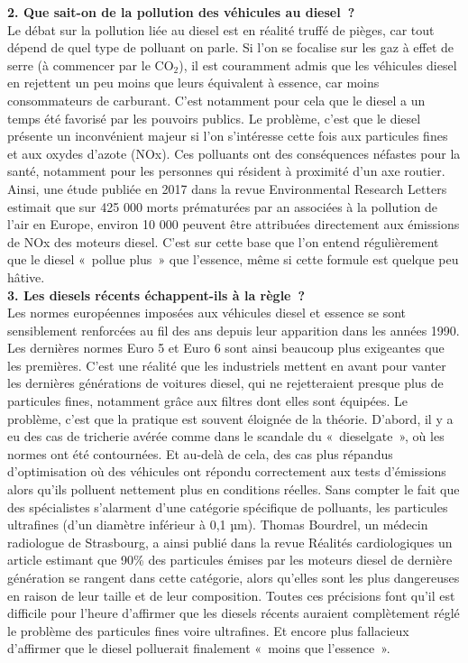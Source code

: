 \documentclass[8pt]{article}
\begin{document}
\textbf{2. Que sait-on de la pollution des véhicules au diesel~?}\\

Le débat sur la pollution liée au diesel est en réalité truffé de pièges, car tout dépend de quel type de polluant on parle. Si l’on se focalise sur les gaz à effet de serre (à commencer par le CO$_2$), il est couramment admis que les véhicules diesel en rejettent un peu moins que leurs équivalent à essence, car moins consommateurs de carburant. C’est notamment pour cela que le diesel a un temps été favorisé par les pouvoirs publics.
Le problème, c’est que le diesel présente un inconvénient majeur si l’on s’intéresse cette fois aux particules fines et aux oxydes d’azote (NOx). Ces polluants ont des conséquences néfastes pour la santé, notamment pour les personnes qui résident à proximité d’un axe routier.
Ainsi, une étude publiée en 2017 dans la revue Environmental Research Letters estimait que sur 425 000 morts prématurées par an associées à la pollution de l’air en Europe, environ 10 000 peuvent être attribuées directement aux émissions de NOx des moteurs diesel. C’est sur cette base que l’on entend régulièrement que le diesel «~pollue plus~» que l’essence, même si cette formule est quelque peu hâtive.\\

\textbf{3. Les diesels récents échappent-ils à la règle~?}\\

Les normes européennes imposées aux véhicules diesel et essence se sont sensiblement renforcées au fil des ans depuis leur apparition dans les années 1990. Les dernières normes Euro 5 et Euro 6 sont ainsi beaucoup plus exigeantes que les premières. C’est une réalité que les industriels mettent en avant pour vanter les dernières générations de voitures diesel, qui ne rejetteraient presque plus de particules fines, notamment grâce aux filtres dont elles sont équipées.
Le problème, c’est que la pratique est souvent éloignée de la théorie. D’abord, il y a eu des cas de tricherie avérée comme dans le scandale du «~dieselgate~», où les normes ont été contournées. Et au-delà de cela, des cas plus répandus d’optimisation où des véhicules ont répondu correctement aux tests d’émissions alors qu’ils polluent nettement plus en conditions réelles.
Sans compter le fait que des spécialistes s’alarment d’une catégorie spécifique de polluants, les particules ultrafines (d’un diamètre inférieur à 0,1 µm). Thomas Bourdrel, un médecin radiologue de Strasbourg, a ainsi publié dans la revue Réalités cardiologiques un article estimant que 90\% des particules émises par les moteurs diesel de dernière génération se rangent dans cette catégorie, alors qu’elles sont les plus dangereuses en raison de leur taille et de leur composition.
Toutes ces précisions font qu’il est difficile pour l’heure d’affirmer que les diesels récents auraient complètement réglé le problème des particules fines voire ultrafines. Et encore plus fallacieux d’affirmer que le diesel polluerait finalement «~moins que l’essence~».\\
\end{document}
